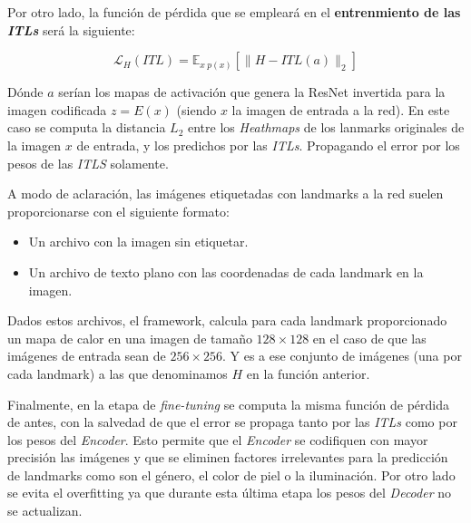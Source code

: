             \medskip

            \noindent Por otro lado, la función de pérdida que se empleará en el \textbf{entrenmiento de las \textit{ITLs}} será la siguiente: 

            \begin{equation} \label{eq::L2}
                \mathcal{L}_H(ITL) = \mathbb{E}_{x ~ p(x)} \left[ \| H-ITL(a)\|_2 \right]
            \end{equation}

            \noindent Dónde $a$ serían los mapas de activación que genera la ResNet invertida para la imagen codificada $z=E(x)$ (siendo $x$ la imagen de entrada a la red). En este caso se computa la distancia \textbf{$L_2$} entre los \textit{Heathmaps} de los lanmarks originales de la imagen $x$ de entrada, y los predichos por las \textit{ITLs}. Propagando el error por los pesos de las \textit{ITLS} solamente.

            \medskip

            \noindent A modo de aclaración, las imágenes etiquetadas con landmarks a la red suelen proporcionarse con el siguiente formato: 

            \begin{itemize}
                \item Un archivo con la imagen sin etiquetar. 
                \item Un archivo de texto plano con las coordenadas de cada landmark en la imagen.
            \end{itemize}

            \noindent Dados estos archivos, el framework, calcula para cada landmark proporcionado un mapa de calor en una imagen de tamaño $128 \times 128$ en el caso de que las imágenes de entrada sean de $256 \times 256$. Y es a ese conjunto de imágenes (una por cada landmark) a las que denominamos $H$ en la función anterior.

            \medskip

            \noindent Finalmente, en la etapa de \textit{fine-tuning} se computa la misma función de pérdida de antes, con la salvedad de que el error se propaga tanto por las \textit{ITLs} como por los pesos del \textit{Encoder}. Esto permite que el \textit{Encoder} se codifiquen con mayor precisión las imágenes y que se eliminen factores irrelevantes para la predicción de landmarks como son el género, el color de piel o la iluminación. Por otro lado se evita el overfitting ya que durante esta última etapa los pesos del \textit{Decoder} no se actualizan.

